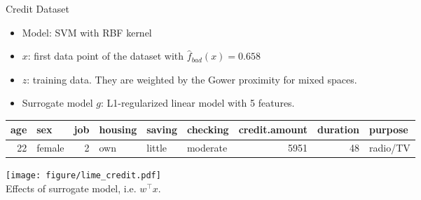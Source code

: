 \documentclass[aspectratio=169]{../latex_main/tntbeamer}  %
\begin{document}
\begin{frame}{Credit Dataset}

\vspace{-1.5em}
	\begin{itemize}
		\item Model: SVM with RBF kernel
		\item $x$: first data point of the dataset with $\hat{f}_{bad}(x) = 0.658$
		\item $z$: training data. They are weighted by the Gower proximity for mixed spaces. 
		\item Surrogate model $g$: L1-regularized linear model with 5 features. 
	\end{itemize}
	\begin{table}[ht]
		\centering
		\scriptsize
		\begin{tabular}{rlrlllrrl}
			\hline
			age & sex & job & housing & saving & checking & credit.amount & duration & purpose \\ 
			\hline
			 22 & female &   2 & own & little & moderate & 5951 &  48 & radio/TV \\ 
			\hline
		\end{tabular}
	\end{table}
\begin{center}
	\texttt{[image: figure/lime\_credit.pdf]}\\[-0.4em]
	Effects of surrogate model, i.e. $w^\top x$.
\end{center}

\end{frame}
\end{document}
